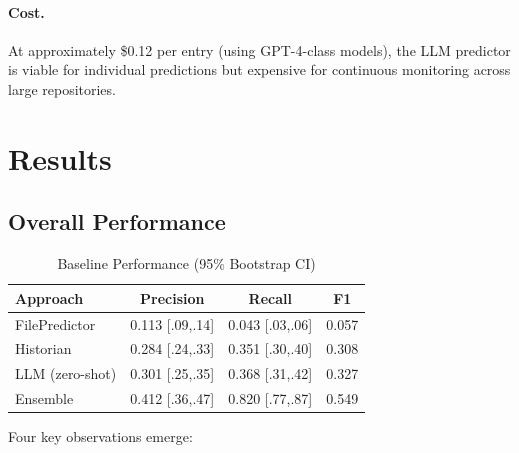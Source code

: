 \documentclass[sigconf,nonacm]{acmart}
\begin{document}
\paragraph{Cost.} At approximately \$0.12 per entry (using GPT-4-class models), the LLM predictor is viable for individual predictions but expensive for continuous monitoring across large repositories.

\section{Results}
\label{sec:results}

\subsection{Overall Performance}

\begin{table}[h]
\caption{Baseline Performance (95\% Bootstrap CI)}
\label{tab:results}
\begin{tabular}{lccc}
\toprule
\textbf{Approach} & \textbf{Precision} & \textbf{Recall} & \textbf{F1} \\
\midrule
FilePredictor & 0.113 [.09,.14] & 0.043 [.03,.06] & 0.057 \\
Historian & 0.284 [.24,.33] & 0.351 [.30,.40] & 0.308 \\
LLM (zero-shot) & 0.301 [.25,.35] & 0.368 [.31,.42] & 0.327 \\
Ensemble & 0.412 [.36,.47] & 0.820 [.77,.87] & 0.549 \\
\bottomrule
\end{tabular}
\end{table}

Four key observations emerge:
\end{document}
